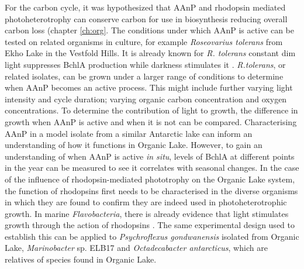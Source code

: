 For the carbon cycle, it was hypothesized that \ac{AAnP} and rhodopsin mediated photoheterotrophy can conserve carbon for use in biosynthesis  reducing overall carbon loss (chapter \ref{ch:org}.
The conditions under which \ac{AAnP} is active can be tested on related organisms in culture, for example \emph{Roseovarius tolerans} from Ekho Lake in the Vestfold Hills. 
It is already known for \emph{R. tolerans} constant dim light suppresses \ac{BchlA} production while darkness stimulates it \cite{Labrenz1999}.
\emph{R.tolerans}, or related isolates, can be grown under a larger range of conditions to determine when \ac{AAnP} becomes an active process.
This might include further varying light intensity and cycle duration; varying organic carbon concentration and oxygen concentrations.
To determine the contribution of light to growth, the difference in growth when \ac{AAnP} is active and when it is not can be compared.
Characterising \ac{AAnP} in a model isolate from a similar Antarctic lake can inform an understanding of how it functions in Organic Lake.
However, to gain an understanding of when \ac{AAnP} is active \emph{in situ}, levels of \ac{BchlA} at different points in the year can be measured to see it correlates with seasonal changes.
In the case of the influence of rhodopsin-mediated phototrophy on the Organic Lake system, the function of rhodopsins first needs to be characterised in the diverse organisms in which they are found to confirm they are indeed used in photoheterotrophic growth.
In marine \emph{Flavobacteria}, there is already evidence that light stimulates growth through the action of rhodopsins \cite{Gomez-Consarnau2007}.
The same experimental design used to establish this can be applied to \emph{Psychroflexus gondwanensis} isolated from Organic Lake, \emph{Marinobacter} sp. ELB17 and \emph{Octadecabacter antarcticus}, which are relatives of species found in Organic Lake.

